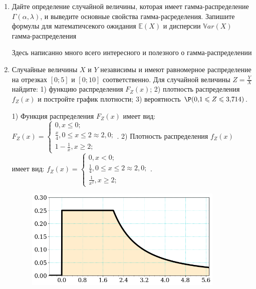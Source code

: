 \documentclass[a4paper,14pt]{article}
\begin{document}
\begin{enumerate}


\item

Дайте определение случайной величины, которая имеет гамма-распределение $\Gamma(\alpha,  \lambda)$, и выведите основные свойства гамма-расределения. Запишите формулы для математичсекого ожидания
$\mathbb{E}(X)$ и дисперсии $\mathbb{V}ar(X)$ гамма-распределения




Здесь написанно много всего интересного и полезного о гамма-распределении


\item



Случайные величины $X$ и $Y$ независимы и имеют равномерное
распределение на отрезках $[0;5]$ и $[0;10]$ соответственно. Для случайной величины $Z=\frac{Y}{X}$ найдите: 
1) функцию распределения $F_Z(x)$;
2) плотность распределения $f_Z(x)$ и постройте график плотности;
3) вероятность $\P(0,\!1\leqslant Z\leqslant 3,\!714)$.




1) Функция распределения $F_Z(x)$ имеет вид:
$
F_Z(x)=\left\{
\begin{array}{l}
0, x\leqslant 0;\\
\frac{x}{4}, 0\leqslant x\leqslant 2\approx 2,\!0;\\
1 - \frac{1}{x}, x\geqslant2;
\end{array}.
\right.
$
2) Плотность распределения $f_Z(x)$ имеет вид:
$
f_Z(x)=\left\{
\begin{array}{l}
0, x<0;\\
\frac{1}{4}, 0\leqslant x\leqslant 2\approx 2,\!0;\\
\frac{1}{x^{2}}, x\geqslant2;
\end{array}.
\right.
$


\begin{figure}[H]
    \includegraphics[width=0.9\textwidth]{2_53d16}
\end{figure}



\end{enumerate}
\end{document}
